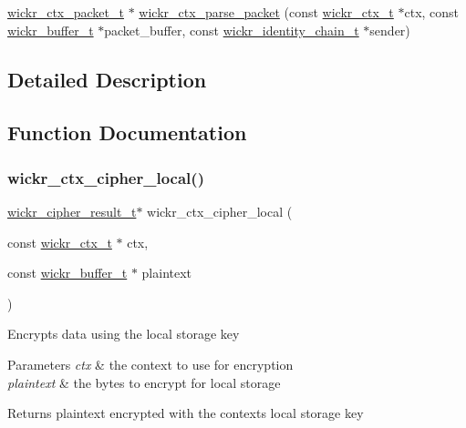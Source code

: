 \begin{DoxyCompactItemize}
\item 
\mbox{\hyperlink{structwickr__ctx__packet}{wickr\+\_\+ctx\+\_\+packet\+\_\+t}} $\ast$ \mbox{\hyperlink{group__wickr__ctx_ga5032fb65627a509fd9486ea9696e643d}{wickr\+\_\+ctx\+\_\+parse\+\_\+packet}} (const \mbox{\hyperlink{structwickr__ctx}{wickr\+\_\+ctx\+\_\+t}} $\ast$ctx, const \mbox{\hyperlink{structwickr__buffer}{wickr\+\_\+buffer\+\_\+t}} $\ast$packet\+\_\+buffer, const \mbox{\hyperlink{structwickr__identity__chain}{wickr\+\_\+identity\+\_\+chain\+\_\+t}} $\ast$sender)
\end{DoxyCompactItemize}


\subsection{Detailed Description}


\subsection{Function Documentation}
\mbox{\label{group__wickr__ctx_gaeff6704dded2d44f689eca5ad25843f8}} 
\subsubsection{\texorpdfstring{wickr\+\_\+ctx\+\_\+cipher\+\_\+local()}{wickr\_ctx\_cipher\_local()}}
{\footnotesize\ttfamily \mbox{\hyperlink{structwickr__cipher__result}{wickr\+\_\+cipher\+\_\+result\+\_\+t}}$\ast$ wickr\+\_\+ctx\+\_\+cipher\+\_\+local (\begin{DoxyParamCaption}\item[{const \mbox{\hyperlink{structwickr__ctx}{wickr\+\_\+ctx\+\_\+t}} $\ast$}]{ctx,  }\item[{const \mbox{\hyperlink{structwickr__buffer}{wickr\+\_\+buffer\+\_\+t}} $\ast$}]{plaintext }\end{DoxyParamCaption})}

Encrypts data using the local storage key


\begin{DoxyParams}{Parameters}
{\em ctx} & the context to use for encryption \\
\hline
{\em plaintext} & the bytes to encrypt for local storage \\
\hline
\end{DoxyParams}
\begin{DoxyReturn}{Returns}
\textquotesingle{}plaintext\textquotesingle{} encrypted with the context\textquotesingle{}s local storage key 
\end{DoxyReturn}
\mbox{\label{group__wickr__ctx_ga0b985fb2cd05fb482b5ed175dfd650a0}} 
